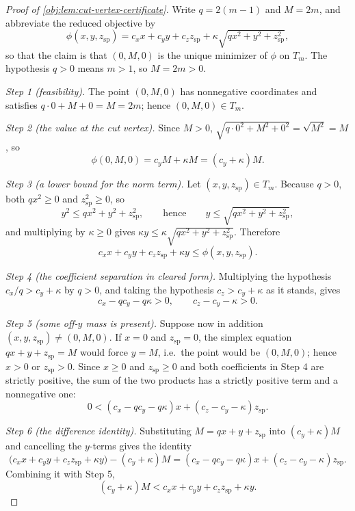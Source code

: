 \documentclass[11pt]{article}
\begin{document}
\begin{proof}[Proof of \cref{obj:lem:cut-vertex-certificate}]
Write \(q=2(m-1)\) and \(M=2m\), and abbreviate the reduced objective by
\[
\phi(x,y,z_{\mathrm{sp}})
=c_xx+c_yy+c_zz_{\mathrm{sp}}
+\kappa\sqrt{qx^2+y^2+z_{\mathrm{sp}}^2},
\]
so that the claim is that \((0,M,0)\) is the unique minimizer of \(\phi\) on \(T_m\).  The hypothesis \(q>0\) means \(m>1\), so \(M=2m>0\).

\emph{Step 1 (feasibility).}  The point \((0,M,0)\) has nonnegative coordinates and satisfies \(q\cdot0+M+0=M=2m\); hence \((0,M,0)\in T_m\). %

\emph{Step 2 (the value at the cut vertex).}  Since \(M>0\), \(\sqrt{q\cdot0^2+M^2+0^2}=\sqrt{M^2}=M\), so
\[
\phi(0,M,0)=c_yM+\kappa M=(c_y+\kappa)M .
\]

\emph{Step 3 (a lower bound for the norm term).}  Let \((x,y,z_{\mathrm{sp}})\in T_m\).  Because \(q>0\), both \(qx^2\ge0\) and \(z_{\mathrm{sp}}^2\ge0\), so
\[
y^2\le qx^2+y^2+z_{\mathrm{sp}}^2,
\qquad\text{hence}\qquad
y\le\sqrt{qx^2+y^2+z_{\mathrm{sp}}^2},
\]
and multiplying by \(\kappa\ge0\) gives \(\kappa y\le\kappa\sqrt{qx^2+y^2+z_{\mathrm{sp}}^2}\).  Therefore
\[
c_xx+c_yy+c_zz_{\mathrm{sp}}+\kappa y\le\phi(x,y,z_{\mathrm{sp}}).
\]

\emph{Step 4 (the coefficient separation in cleared form).}  Multiplying the hypothesis \(c_x/q>c_y+\kappa\) by \(q>0\), and taking the hypothesis \(c_z>c_y+\kappa\) as it stands, gives
\[
c_x-qc_y-q\kappa>0,
\qquad
c_z-c_y-\kappa>0 .
\]

\emph{Step 5 (some off-\(y\) mass is present).}  Suppose now in addition \((x,y,z_{\mathrm{sp}})\ne(0,M,0)\).  If \(x=0\) and \(z_{\mathrm{sp}}=0\), the simplex equation \(qx+y+z_{\mathrm{sp}}=M\) would force \(y=M\), i.e.\ the point would be \((0,M,0)\); hence \(x>0\) or \(z_{\mathrm{sp}}>0\).  Since \(x\ge0\) and \(z_{\mathrm{sp}}\ge0\) and both coefficients in Step 4 are strictly positive, the sum of the two products has a strictly positive term and a nonnegative one:
\[
0<(c_x-qc_y-q\kappa)x+(c_z-c_y-\kappa)z_{\mathrm{sp}} .
\]

\emph{Step 6 (the difference identity).}  Substituting \(M=qx+y+z_{\mathrm{sp}}\) into \((c_y+\kappa)M\) and cancelling the \(y\)-terms gives the identity
\[
\bigl(c_xx+c_yy+c_zz_{\mathrm{sp}}+\kappa y\bigr)-(c_y+\kappa)M
=(c_x-qc_y-q\kappa)x+(c_z-c_y-\kappa)z_{\mathrm{sp}} .
\]
Combining it with Step 5,
\[
(c_y+\kappa)M<c_xx+c_yy+c_zz_{\mathrm{sp}}+\kappa y .
\]


\end{proof}
\end{document}
